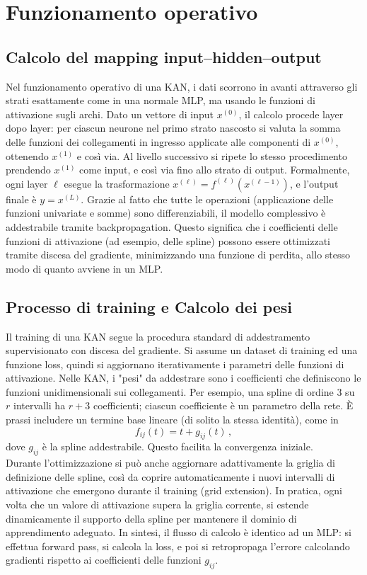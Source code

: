 \documentclass[a4paper,12pt]{report}
\begin{document}
	\section{Funzionamento operativo}
	
	\subsection{Calcolo del mapping input–hidden–output}
	
	Nel funzionamento operativo di una KAN, i dati scorrono in avanti attraverso gli strati esattamente come in una normale MLP, ma usando le funzioni di attivazione sugli archi. Dato un vettore di input $x^{(0)}$, il calcolo procede layer dopo layer: per ciascun neurone nel primo strato nascosto si valuta la somma delle funzioni dei collegamenti in ingresso applicate alle componenti di $x^{(0)}$, ottenendo $x^{(1)}$ e così via. Al livello successivo si ripete lo stesso procedimento prendendo $x^{(1)}$ come input, e così via fino allo strato di output. Formalmente, ogni layer $\ell$ esegue la trasformazione $x^{(\ell)} = f^{(\ell)}(x^{(\ell-1)})$, e l’output finale è $y = x^{(L)}$. Grazie al fatto che tutte le operazioni (applicazione delle funzioni univariate e somme) sono differenziabili, il modello complessivo è addestrabile tramite backpropagation. Questo significa che i coefficienti delle funzioni di attivazione (ad esempio, delle spline) possono essere ottimizzati tramite discesa del gradiente, minimizzando una funzione di perdita, allo stesso modo di quanto avviene in un MLP.
	
	\subsection{Processo di training e Calcolo dei pesi}
	
	Il training di una KAN segue la procedura standard di addestramento supervisionato con discesa del gradiente. Si assume un dataset di training ed una funzione loss, quindi si aggiornano iterativamente i parametri delle funzioni di attivazione. Nelle KAN, i "pesi" da addestrare sono i coefficienti che definiscono le funzioni unidimensionali sui collegamenti. Per esempio, una spline di ordine 3 su $r$ intervalli ha $r+3$ coefficienti; ciascun coefficiente è un parametro della rete. È prassi includere un termine base lineare (di solito la stessa identità), come in 
	\[
	f_{ij}(t) = t + g_{ij}(t)\,, 
	\]
	dove $g_{ij}$ è la spline addestrabile. Questo facilita la convergenza iniziale. \\
	Durante l’ottimizzazione si può anche aggiornare adattivamente la griglia di definizione delle spline, così da coprire automaticamente i nuovi intervalli di attivazione che emergono durante il training (grid extension). In pratica, ogni volta che un valore di attivazione supera la griglia corrente, si estende dinamicamente il supporto della spline per mantenere il dominio di apprendimento adeguato. In sintesi, il flusso di calcolo è identico ad un MLP: si effettua forward pass, si calcola la loss, e poi si retropropaga l’errore calcolando gradienti rispetto ai coefficienti delle funzioni $g_{ij}$.
	
\end{document}
